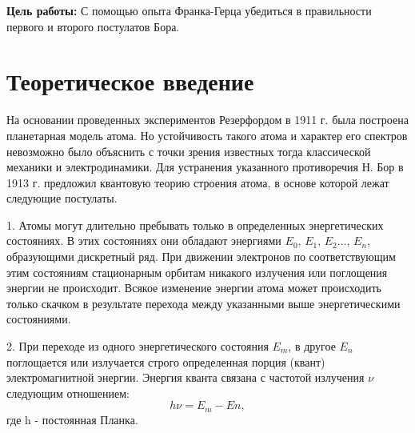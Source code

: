 




\def\labauthors{Войтович Д.А., Карусевич А.А., Разова А.А}
\def\labgroup{430}
\def\labnumber{5}
\def\labtheme{Опыт Франка-Герца}


{\bfseries Цель работы:} С помощью опыта Франка-Герца убедиться в правильности первого и второго постулатов Бора.  

\section{Теоретическое введение}

На основании проведенных экспериментов Резерфордом в 1911 г. была построена планетарная модель атома. Но устойчивость такого атома и характер его спектров невозможно было объяснить с точки зрения известных тогда классической механики и электродинамики. Для устранения указанного противоречия Н. Бор в 1913 г. предложил квантовую теорию строения атома, в основе которой лежат следующие постулаты.


1.	Атомы могут длительно пребывать только в определенных энергетических состояниях. В этих состояниях они обладают энергиями $E_0,\,E_1,\,E_2\dots,\,E_n$, образующими дискретный ряд. При движении электронов по соответствующим этим состояниям стационарным орбитам никакого излучения или поглощения энергии не происходит. Всякое изменение энергии атома может происходить только скачком в результате перехода между указанными выше энергетическими состояниями.


2.	При переходе из одного энергетического состояния $E_m$, в другое $E_n$ поглощается или излучается строго определенная порция (квант) электромагнитной энергии. Энергия кванта связана с частотой излучения $\nu$ следующим отношением: $$h\nu=E_m-En,$$ где h - постоянная Планка.

